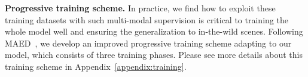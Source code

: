 

{\bf Progressive training scheme.}  In practice, we find how to exploit these training datasets with such multi-modal supervision is critical to training the whole model well and ensuring the generalization to in-the-wild scenes. Following MAED~\citep{maed:wan2021encoder},  we develop an improved progressive training scheme adapting to our model, which consists of three training phases. Please see more details about this training scheme in Appendix~\ref{appendix:training}.


